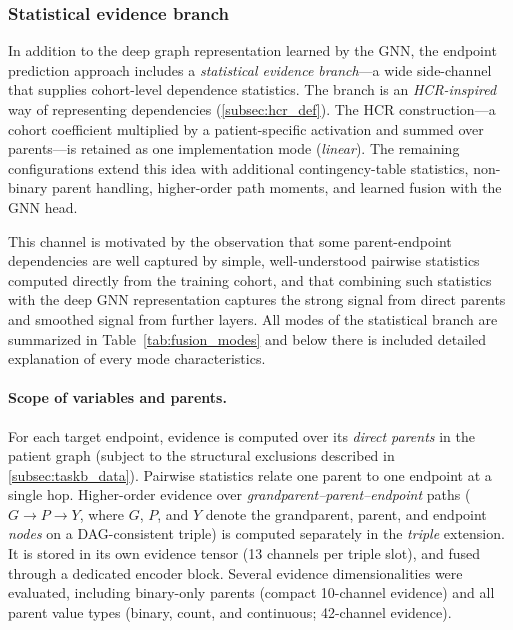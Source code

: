 

\subsubsection{Statistical evidence branch}
\label{subsec:hcr_application}

In addition to the deep graph representation learned by the GNN, the endpoint
prediction approach includes a \emph{statistical evidence branch}---a wide
side-channel that supplies cohort-level dependence statistics.
The branch is an \emph{HCR-inspired} way of representing dependencies
(\cref{subsec:hcr_def}).
The HCR construction---a cohort coefficient multiplied by a
patient-specific activation and summed over parents---is retained as one
implementation mode (\emph{linear}).
The remaining configurations extend this idea with additional
contingency-table statistics, non-binary parent handling, higher-order path
moments, and learned fusion with the GNN head.

This channel is motivated by the 
observation that some parent-endpoint dependencies are well captured by simple, 
well-understood pairwise 
statistics computed directly from the training cohort, and that combining such statistics
 with the deep GNN 
representation captures the strong signal from direct parents and smoothed signal 
from further layers.
All modes of the statistical branch are summarized in
Table~\ref{tab:fusion_modes} and below there is included detailed explanation
of every mode characteristics.

\paragraph{Scope of variables and parents.}
For each target endpoint, evidence is computed over its \emph{direct parents}
in the patient graph (subject to the structural exclusions described in
\cref{subsec:taskb_data}).
Pairwise statistics relate one parent to one endpoint at a single hop.
Higher-order evidence over \emph{grandparent--parent--endpoint} paths
(\(G \rightarrow P \rightarrow Y\), where \(G\), \(P\), and \(Y\) denote the
grandparent, parent, and endpoint \emph{nodes} on a DAG-consistent triple) is computed separately in the
\emph{triple} extension.  It is
stored in its own evidence tensor (13 channels per triple slot), and fused 
through a dedicated encoder block.
Several evidence dimensionalities were evaluated, including binary-only
parents (compact 10-channel evidence) and all parent value types (binary,
count, and continuous; 42-channel evidence).

